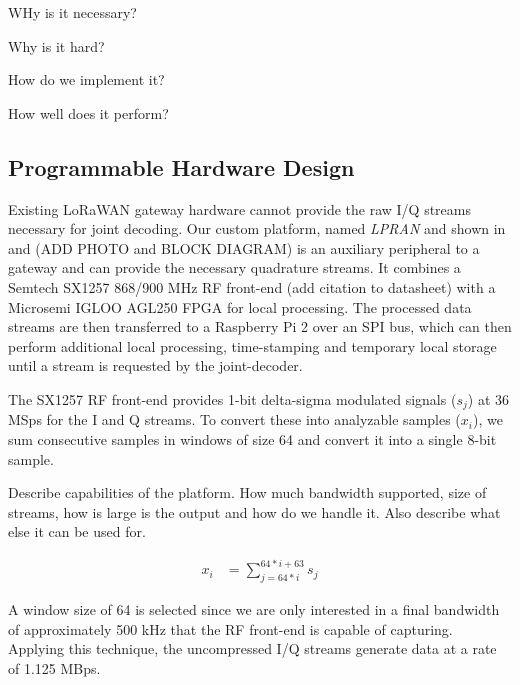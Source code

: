 WHy is it necessary?

Why is it hard?

How do we implement it?

How well does it perform?

\subsection{Programmable Hardware Design}
\label{sec:hardware}

Existing LoRaWAN gateway hardware cannot provide the raw I/Q streams necessary
for joint decoding. Our custom platform, named \textit{LPRAN} and shown in
 and  {\color{blue} (ADD PHOTO and
BLOCK DIAGRAM)} is an auxiliary peripheral to a gateway and can provide the
necessary quadrature streams. It combines a Semtech SX1257 868/900 MHz RF
front-end {\color{blue} (add citation to datasheet)} with a Microsemi IGLOO
AGL250 FPGA for local processing. The processed data streams are then
transferred to a Raspberry Pi 2 over an SPI bus, which can then perform
additional local processing, time-stamping and temporary local storage until a
stream is requested by the joint-decoder.

The SX1257 RF front-end provides 1-bit delta-sigma modulated signals ($s_j$)
at 36 MSps for the I and Q streams. To convert these into analyzable samples
($x_i$), we sum consecutive samples in windows of size 64 and convert it into
a single 8-bit sample.

{\color{blue} Describe capabilities of the platform. How much bandwidth supported, size of streams, how is large is the output and how do we handle it. Also describe what else it can be used for.}

\begin{align*}
x_i &= \sum_{j=64*i}^{64*i + 63} s_j
\end{align*}

A window size of 64 is selected since we are only interested in a final
bandwidth of approximately 500 kHz that the RF front-end is capable of
capturing. Applying this technique, the uncompressed I/Q streams generate data
at a rate of 1.125 MBps.

